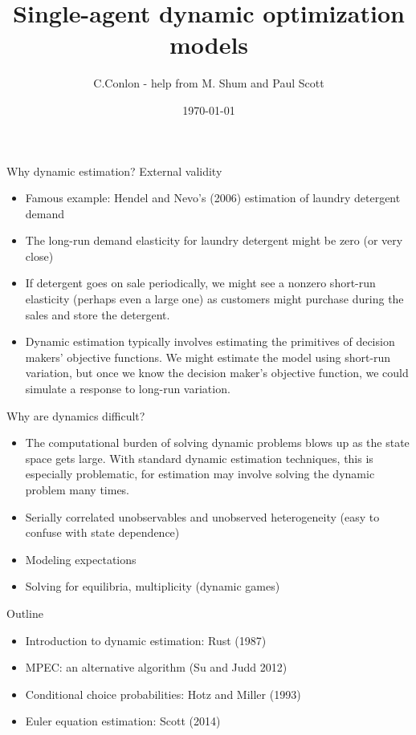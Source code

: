 \documentclass[aspectratio=169,11pt]{beamer}
\title [Single-agent dynamic optimization models]{Single-agent dynamic optimization models}
\author{C.Conlon - help from M. Shum and Paul Scott}
\institute{Grad IO}
\date{\today}
\begin{document}
\begin{frame}
\titlepage
\end{frame}


\begin{frame}{Why dynamic estimation? External validity}
\begin{itemize}
	\item<1-> Famous example: Hendel and Nevo's (2006) estimation of laundry detergent demand

	\medskip
	\item<2-> The long-run demand elasticity for laundry detergent might be zero (or very close)

	\medskip
	\item<3-> If detergent goes on sale periodically, we might see a nonzero short-run elasticity 
	(perhaps even a large one) as customers might purchase during the sales and store
	the detergent.

	\medskip
	\item<4-> Dynamic estimation typically involves estimating the primitives of decision makers' 
	objective functions. We might estimate the model using short-run variation, but once we 
	know the decision maker's objective function, we could simulate a response to long-run 
	variation.

\end{itemize}
\end{frame}



\begin{frame}{Why are dynamics difficult?}
\begin{itemize}
	\item The computational burden of solving dynamic problems blows up 
		as the state space gets large. With standard dynamic estimation techniques, 
		this is especially problematic, 
		for estimation may involve solving the dynamic problem many times. 
		
	\medskip
	\item Serially correlated unobservables and unobserved heterogeneity
	(easy to confuse with state dependence) 
	\medskip
	\item Modeling expectations
	\medskip	
	\item Solving for equilibria, multiplicity (dynamic games)
\end{itemize}
\end{frame}


\begin{frame}{Outline}
\begin{itemize}
	\item Introduction to dynamic estimation: Rust (1987)
	\item MPEC: an alternative algorithm (Su and Judd 2012)

	\medskip
	\item Conditional choice probabilities: Hotz and Miller (1993)

	\medskip
	\item Euler equation estimation: Scott (2014)

\end{itemize}
\end{frame}
\end{document}
